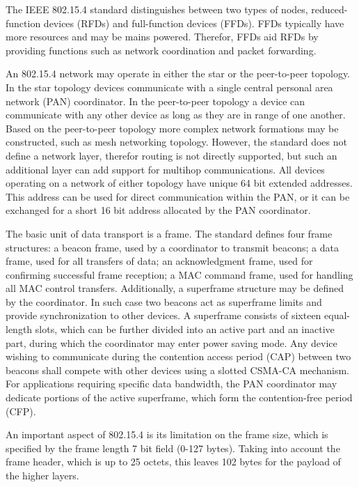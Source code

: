 \documentclass[12pt, titlepage, a4paper]{report}
\begin{document}
The IEEE 802.15.4 standard distinguishes between two types of nodes, reduced-function devices (RFDs) and full-function devices (FFDs).                                   FFDs typically have more resources and may be mains powered.  Therefor, FFDs aid RFDs by providing functions such as network coordination and packet forwarding.

An 802.15.4 network may operate in either the star or the peer-to-peer topology. In the star topology devices communicate with a single central                            personal area network (PAN) coordinator. In the peer-to-peer topology a device can communicate with any other device as long as they are in range of one another. Based on the peer-to-peer topology more complex network formations may be constructed, such as mesh networking topology. However, the standard does not define a network layer, therefor routing is not directly supported, but such an additional layer can add support for multihop communications. All devices operating on a network of either topology have unique 64 bit extended addresses. This address can be used for direct communication within the PAN, or it can be exchanged for a short 16 bit address allocated by the PAN coordinator.

The basic unit of data transport is a frame. The standard defines four frame structures: a beacon frame, used by a coordinator to transmit beacons;
a data frame, used for all transfers of data; an acknowledgment frame, used for confirming successful frame reception; a MAC command frame, used for handling all MAC control transfers. Additionally, a superframe structure may be defined by the coordinator. In such case two beacons act as superframe limits and provide synchronization to other devices. A superframe consists of sixteen equal-length slots, which can be further divided into an active part and an inactive part, during which the coordinator may enter power saving mode. Any device wishing to communicate during the contention access period (CAP) between two beacons shall compete with other devices using a slotted CSMA-CA mechanism. For applications requiring specific data bandwidth, the PAN coordinator may dedicate portions of the active superframe, which form the contention-free period (CFP).

An important aspect of 802.15.4 is its limitation on the frame size, which is specified by the frame length 7 bit field (0-127 bytes). Taking into account the frame header, which is up to 25 octets, this leaves 102 bytes for the payload of the higher layers.
\end{document}
